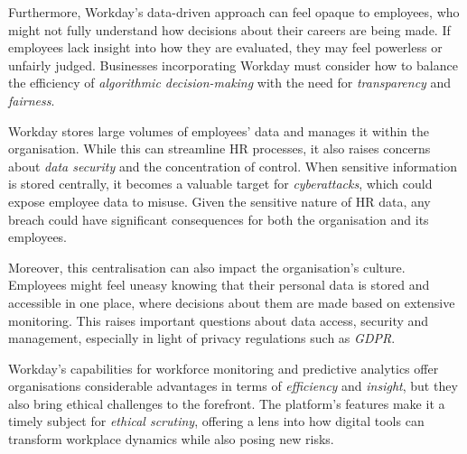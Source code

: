 \documentclass[a4paper]{article}
\begin{document}
Furthermore, Workday’s data-driven approach can feel opaque to employees, who might not fully understand how decisions about their careers are being made. If employees lack insight into how they are evaluated, they may feel powerless or unfairly judged. Businesses incorporating Workday must consider how to balance the efficiency of \textit{algorithmic decision-making} with the need for \textit{transparency} and \textit{fairness}.

Workday stores large volumes of employees' data and manages it within the organisation. While this can streamline HR processes, it also raises concerns about \textit{data security} and the concentration of control. When sensitive information is stored centrally, it becomes a valuable target for \textit{cyberattacks}, which could expose employee data to misuse. Given the sensitive nature of HR data, any breach could have significant consequences for both the organisation and its employees.

Moreover, this centralisation can also impact the organisation’s culture. Employees might feel uneasy knowing that their personal data is stored and accessible in one place, where decisions about them are made based on extensive monitoring. This raises important questions about data access, security and management, especially in light of privacy regulations such as \textit{GDPR}.

Workday’s capabilities for workforce monitoring and predictive analytics offer organisations considerable advantages in terms of \textit{efficiency} and \textit{insight}, but they also bring ethical challenges to the forefront. The platform’s features make it a timely subject for \textit{ethical scrutiny}, offering a lens into how digital tools can transform workplace dynamics while also posing new risks. 

\thispagestyle{fancy}
\pagestyle{fancy}
\end{document}
